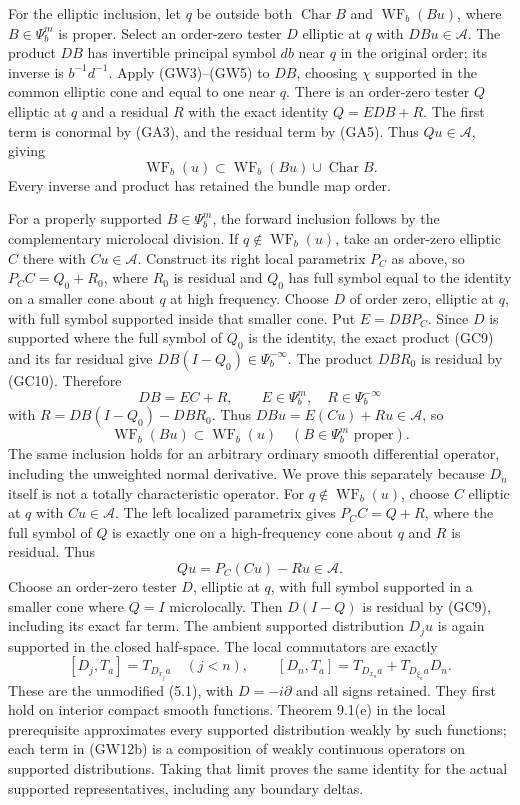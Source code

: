 \documentclass[
  11pt,
]{article}
\begin{document}
For the elliptic inclusion, let \(q\) be outside both
\(\operatorname{Char}B\) and \(\operatorname{WF}_b(Bu)\), where
\(B\in\Psi_b^m\) is proper. Select an order-zero tester \(D\) elliptic
at \(q\) with \(DBu\in\mathcal A\). The product \(DB\) has invertible
principal symbol \(d b\) near \(q\) in the original order; its inverse
is \(b^{-1}d^{-1}\). Apply (GW3)--(GW5) to \(DB\), choosing \(\chi\)
supported in the common elliptic cone and equal to one near \(q\). There
is an order-zero tester \(Q\) elliptic at \(q\) and a residual \(R\)
with the exact identity \(Q=E DB+R\). The first term is conormal by
(GA3), and the residual term by (GA5). Thus \(Qu\in\mathcal A\), giving
\[
 \operatorname{WF}_b(u)
   \subset\operatorname{WF}_b(Bu)\cup\operatorname{Char}B.
 \tag{GW10}
\] Every inverse and product has retained the bundle map order.

For a properly supported \(B\in\Psi_b^m\), the forward inclusion follows
by the complementary microlocal division. If
\(q\notin\operatorname{WF}_b(u)\), take an order-zero elliptic \(C\)
there with \(Cu\in\mathcal A\). Construct its right local parametrix
\(P_C\) as above, so \(P_CC=Q_0+R_0\), where \(R_0\) is residual and
\(Q_0\) has full symbol equal to the identity on a smaller cone about
\(q\) at high frequency. Choose \(D\) of order zero, elliptic at \(q\),
with full symbol supported inside that smaller cone. Put \(E=DBP_C\).
Since \(D\) is supported where the full symbol of \(Q_0\) is the
identity, the exact product (GC9) and its far residual give
\(DB(I-Q_0)\in\Psi_b^{-\infty}\). The product \(DBR_0\) is residual by
(GC10). Therefore \[
 DB=E C+R,
 \qquad E\in\Psi_b^m,\quad R\in\Psi_b^{-\infty}
 \tag{GW11}
\] with \(R=DB(I-Q_0)-DBR_0\). Thus \(DBu=E(Cu)+Ru\in\mathcal A\), so \[
 \operatorname{WF}_b(Bu)\subset\operatorname{WF}_b(u)
 \quad(B\in\Psi_b^m\text{ proper}).
 \tag{GW12}
\] The same inclusion holds for an arbitrary ordinary smooth
differential operator, including the unweighted normal derivative. We
prove this separately because \(D_n\) itself is not a totally
characteristic operator. For \(q\notin\operatorname{WF}_b(u)\), choose
\(C\) elliptic at \(q\) with \(Cu\in\mathcal A\). The left localized
parametrix gives \(P_CC=Q+R\), where the full symbol of \(Q\) is exactly
one on a high-frequency cone about \(q\) and \(R\) is residual. Thus \[
 Qu=P_C(Cu)-Ru\in\mathcal A.
 \tag{GW12a}
\] Choose an order-zero tester \(D\), elliptic at \(q\), with full
symbol supported in a smaller cone where \(Q=I\) microlocally. Then
\(D(I-Q)\) is residual by (GC9), including its exact far term. The
ambient supported distribution \(D_j u\) is again supported in the
closed half-space. The local commutators are exactly \[
 [D_j,T_a]=T_{D_{x_j}a}\quad(j<n),\qquad
 [D_n,T_a]=T_{D_{x_n}a}+T_{D_{\xi_n}a}D_n .
 \tag{GW12b}
\] These are the unmodified (5.1), with \(D=-i\partial\) and all signs
retained. They first hold on interior compact smooth functions. Theorem
9.1(e) in the local prerequisite approximates every supported
distribution weakly by such functions; each term in (GW12b) is a
composition of weakly continuous operators on supported distributions.
Taking that limit proves the same identity for the actual supported
representatives, including any boundary deltas.
\end{document}
